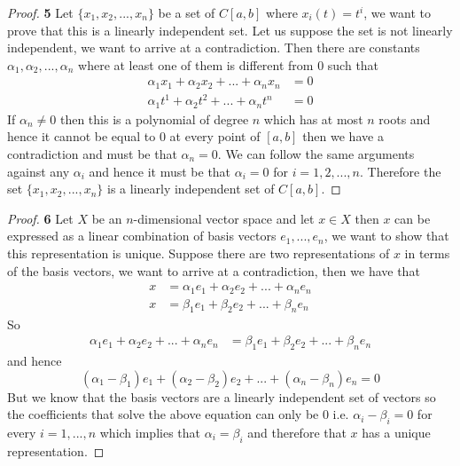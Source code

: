 \documentclass[11pt]{article}
\theoremstyle{definition}
\begin{document}
\begin{proof}{\textbf{5}}
    Let $\{x_1, x_2, ..., x_n\}$ be a set of $C[a,b]$ where $x_i(t) = t^i$,
    we want to prove that this is a linearly independent set.
    Let us suppose the set is not linearly independent,
    we want to arrive at a contradiction. Then there are
    constants $\alpha_1, \alpha_2, ..., \alpha_n$ where at least one of them 
    is different from $0$ such that
    \begin{align*}
        \alpha_1x_1 + \alpha_2x_2 + ... + \alpha_nx_n &= 0\\
        \alpha_1t^1 + \alpha_2t^2 + ... + \alpha_nt^n &= 0
    \end{align*}
    If $\alpha_n \neq 0$ then this is a polynomial of degree $n$ which has at
    most $n$ roots and hence it cannot be equal to $0$ at every point of $[a,b]$
    then we have a contradiction and must be that $\alpha_n = 0$. We can follow
    the same arguments against any $\alpha_i$ and hence it must be that
    $\alpha_i = 0$ for $i = 1,2,...,n$.
    Therefore the set $\{x_1, x_2, ..., x_n\}$ is a linearly independent set of
    $C[a,b]$.
\end{proof}
\cleardoublepage
\begin{proof}{\textbf{6}}
    Let $X$ be an $n$-dimensional vector space and let $x \in X$ then $x$ can
    be expressed as a linear combination of basis vectors $e_1, ..., e_n$,
    we want to show that this representation is unique. Suppose
    there are two representations of $x$ in terms of the basis vectors, we
    want to arrive at a contradiction, then we have that
    \begin{align*}
        x &= \alpha_1e_1 + \alpha_2e_2 + ... + \alpha_n e_n\\
        x &= \beta_1e_1 + \beta_2e_2 + ... + \beta_n e_n
    \end{align*}
    So 
    \begin{align*}
        \alpha_1e_1 + \alpha_2e_2 + ... + \alpha_n e_n
        &= \beta_1e_1 + \beta_2e_2 + ... + \beta_n e_n
    \end{align*}
    and hence
    $$(\alpha_1 - \beta_1)e_1 + (\alpha_2 - \beta_2)e_2 + ...
     + (\alpha_n - \beta_n)e_n = 0$$
    But we know that the basis vectors are a linearly independent set of vectors
    so the coefficients that solve the above equation can only be $0$ i.e.
    $\alpha_i - \beta_i = 0$ for every $i = 1,...,n$
    which implies that $\alpha_i = \beta_i$ and therefore that $x$
    has a unique representation.
\end{proof}
\end{document}
